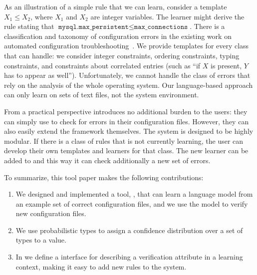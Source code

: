 As an 
illustration of a simple rule that we can learn, consider a template
 $X_1 \le X_2$, where $X_1$ and $X_2$ are
integer variables. The learner might derive the rule stating that
$\texttt{mysql.max\_persistent} \le \texttt{max\_connections}$. There is a classification and taxonomy of configuration errors in the 
existing work on automated configuration troubleshooting~\cite{yin11anempirical, configdataset}. We provide templates for every class that \app can handle: we consider integer constraints, ordering
constraints, typing constraints, and constraints about correlated entries (such as ``if $X$ is present, $Y$ has to appear as well''). 
Unfortunately, we cannot handle the class of errors that rely on the analysis of the whole operating system.
Our language-based approach can only learn on sets of text files, not the system environment.

From a practical perspective \app introduces no additional burden 
to the users: they can simply use \app to check for errors in their configuration files. However, they can also easily extend the framework themselves. The system is designed to be highly modular. If there is a class of rules that \app is not currently learning, the user can develop their own templates and learners for that class. The new learner can be added to \app and this way it can check additionally a new set of errors.


To summarize, this tool paper makes the following contributions:

\begin{enumerate}

  \item We designed and implemented a tool, \app, that can learn a
language model from an example set of correct configuration files, and
we use the model to verify new configuration files.
  \item We use probabilistic types to assign a confidence distribution over a set of types to a value.
  \item In \app we define a interface for describing a verification attribute in a learning context, making it easy to add new rules to the system.

\end{enumerate}

